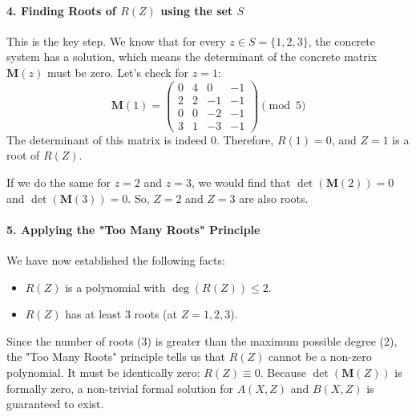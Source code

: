 \documentclass{article}
\begin{document}
\begin{tcolorbox}[breakable, title={Full Example: Proving a Formal Solution Exists}]
\paragraph{4. Finding Roots of $R(Z)$ using the set $S$}
This is the key step. We know that for every $z \in S=\{1,2,3\}$, the concrete system has a solution, which means the determinant of the concrete matrix $\mathbf{M}(z)$ must be zero. Let's check for $z=1$:
\[ \mathbf{M}(1) = \begin{pmatrix} 0 & 4 & 0 & -1 \\ 2 & 2 & -1 & -1 \\ 0 & 0 & -2 & -1 \\ 3 & 1 & -3 & -1 \end{pmatrix} \pmod 5 \]
The determinant of this matrix is indeed 0. Therefore, $R(1)=0$, and $Z=1$ is a root of $R(Z)$.

If we do the same for $z=2$ and $z=3$, we would find that $\det(\mathbf{M}(2))=0$ and $\det(\mathbf{M}(3))=0$. So, $Z=2$ and $Z=3$ are also roots.

\paragraph{5. Applying the "Too Many Roots" Principle}
We have now established the following facts:
\begin{itemize}
    \item $R(Z)$ is a polynomial with $\deg(R(Z)) \le 2$.
    \item $R(Z)$ has at least 3 roots (at $Z=1, 2, 3$).
\end{itemize}
Since the number of roots (3) is greater than the maximum possible degree (2), the "Too Many Roots" principle tells us that $R(Z)$ cannot be a non-zero polynomial. It must be identically zero: $R(Z) \equiv 0$. Because $\det(\mathbf{M}(Z))$ is formally zero, a non-trivial formal solution for $A(X,Z)$ and $B(X,Z)$ is guaranteed to exist.
\end{tcolorbox}

\end{document}
